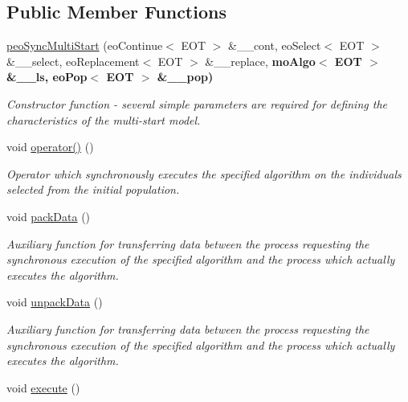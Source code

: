 \subsection*{Public Member Functions}
\begin{CompactItemize}
\item 
\hyperlink{classpeoSyncMultiStart_d29f94aad3c1f443bfffc8b6aee0704c}{peo\-Sync\-Multi\-Start} (eo\-Continue$<$ EOT $>$ \&\_\-\_\-cont, eo\-Select$<$ EOT $>$ \&\_\-\_\-select, eo\-Replacement$<$ EOT $>$ \&\_\-\_\-replace, \bf{mo\-Algo}$<$ EOT $>$ \&\_\-\_\-ls, eo\-Pop$<$ EOT $>$ \&\_\-\_\-pop)
\begin{CompactList}\small\item\em Constructor function - several simple parameters are required for defining the characteristics of the multi-start model. \item\end{CompactList}\item 
void \hyperlink{classpeoSyncMultiStart_76385b33fe514f91cb83f0fbecbeb3c2}{operator()} ()
\begin{CompactList}\small\item\em Operator which synchronously executes the specified algorithm on the individuals selected from the initial population. \item\end{CompactList}\item 
void \hyperlink{classpeoSyncMultiStart_8becfab1922b64708dca5a53e2932a5a}{pack\-Data} ()
\begin{CompactList}\small\item\em Auxiliary function for transferring data between the process requesting the synchronous execution of the specified algorithm and the process which actually executes the algorithm. \item\end{CompactList}\item 
void \hyperlink{classpeoSyncMultiStart_2903a441b77cded266b5fb651e17a5b5}{unpack\-Data} ()
\begin{CompactList}\small\item\em Auxiliary function for transferring data between the process requesting the synchronous execution of the specified algorithm and the process which actually executes the algorithm. \item\end{CompactList}\item 
void \hyperlink{classpeoSyncMultiStart_a4d1c2943c290de540800087b54dc49b}{execute} ()

\end{CompactItemize}

